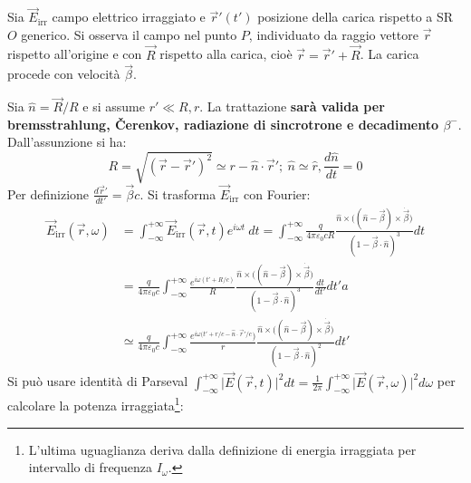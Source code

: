 \documentclass[10pt, a4paper]{scrartcl}
\numberwithin{equation}{subsection}
\theoremstyle{style1}
\begin{document}
Sia $\vec{E}_\text{irr}$ campo elettrico irraggiato e $\vec{r}'(t')$ posizione della carica rispetto a SR $O$ generico. Si osserva il campo nel punto $P$, individuato da raggio vettore $\vec{r}$ rispetto all'origine e con $\vec{R}$ rispetto alla carica, cio\`e $\vec{r}= \vec{r}' + \vec{R}$. La carica procede con velocit\`a $\vec{\beta }$.

Sia $\hat{n} = \vec{R}/R$ e si assume $r' \ll R , r$. La trattazione \textbf{sar\`a valida per bremsstrahlung, \v Cerenkov, radiazione di sincrotrone e decadimento $\beta ^-$}. Dall'assunzione si ha:
\[
R = \sqrt{(\vec{r}-\vec{r}')^2} \simeq r - \hat{n}\cdot \vec{r}'; \ \hat{n} \simeq \hat{r}, \frac{d \hat{n}}{d t} = 0
\] 
Per definizione $\frac{d \vec{r}'}{d t'} = \vec{\beta }c$. Si trasforma $\vec{E}_\text{irr}$ con Fourier:
\begin{equation}
	\begin{split}
		\vec{E}_\text{irr}(\vec{r},\omega)&= \int_{-\infty} ^{+\infty} \vec{E}_{\text{irr}} (\vec{r},t) e^{i\omega t} \ dt =\int_{-\infty} ^{+\infty} \frac{q}{4\pi \varepsilon _0 c R}\frac{\hat{n}\times \big((\hat{n}-\vec{\beta }) \times \dot{ \vec{\beta }}\big)}{(1- \vec{\beta }\cdot \hat{n})^3} dt\\
						  &=\frac{q}{4\pi \varepsilon _0 c} \int_{-\infty} ^{+\infty} \frac{e^{i\omega (t' + R / c)} }{R} \frac{\hat{n}\times \big((\hat{n}-\vec{\beta }) \times \dot{\vec{\beta }}\big)}{(1-\vec{\beta }\cdot \hat{n})^3} \frac{d t}{d t'} dt'a\\
						  &\simeq \frac{q}{4\pi \varepsilon _0 c} \int_{-\infty} ^{+\infty}  \frac{e^{i\omega(t' + r / c - \hat{n}\cdot \vec{r}' / c} )}{r} \frac{\hat{n}\times \big((\hat{n}-\vec{\beta }) \times \dot{\vec{\beta }}\big)}{(1-\vec{\beta }\cdot \hat{n})^2}dt'
	\end{split}
\end{equation}
Si pu\`o usare identit\`a di Parseval $\int_{-\infty} ^{+\infty} \lvert \vec{E}(\vec{r},t) \rvert ^2  dt=\frac{1}{2\pi} \int_{-\infty} ^{+\infty} \lvert \vec{E}(\vec{r},\omega) \rvert ^2  d\omega$ per calcolare la potenza irraggiata\footnote{L'ultima uguaglianza deriva dalla definizione di energia irraggiata per intervallo di frequenza $I_\omega$.}:
\end{document}
